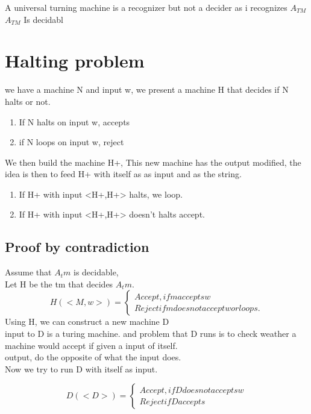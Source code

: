\documentclass[a4paper,10pt,titlepage]{report}
\begin{document}
A universal turning machine is a recognizer but not a decider as i recognizes $A_{TM}$\\


$A_{TM} $ Is decidabl


\section{Halting problem}
we have a machine N and input w, we present a machine H that decides if N halts or not.\\
\begin{enumerate}
\item If N halts on input w, accepts
\item if N loops on input w, reject
\end{enumerate}
We then build the machine H+, This new machine has the output modified, the idea is then to feed H+ with itself as as input and as the string.
\begin{enumerate}
\item If H+ with input <H+,H+> halts, we loop.
\item If H+ with input <H+,H+> doesn't halts accept.
\end{enumerate}

\subsection{Proof by contradiction}

Assume that $A_tm$ is decidable, \\
Let H be the tm that decides $A_tm$.\\

\[
H(<M,w>) = \left\{
                \begin{array}{ll}
                Accept, if m accepts w\\
                Reject if m does not accept w or loops.
\end{array}
\right.
  \]
Using H, we can construct a new machine D\\

input to D is a turing machine. and problem that D runs is to check weather a machine would accept if given a input of itself.\\

output, do the opposite of what the input does.\\

Now we try to run D with itself as input.

\[
D(<D>) = \left\{
                \begin{array}{ll}
                Accept, if D does not accepts w\\
                Reject if D accepts
\end{array}
\right.
  \]
  
\end{document}
